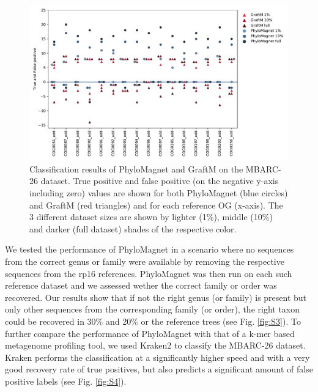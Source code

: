 \documentclass{bioinfo}
\begin{document}
\begin{figure}[!tpb]%
\centerline{\includegraphics[width=.45\textwidth]{Fig2.pdf}}
\caption{Classification results of PhyloMagnet and GraftM on the MBARC-26 dataset. True positive and false positive (on the negative y-axis including zero) values are shown for both PhyloMagnet (blue circles) and GraftM (red triangles) and for each reference OG (x-axis). The 3 different dataset sizes are shown by lighter (1\%), middle (10\%) and darker (full dataset) shades of the respective color.} \label{fig:02}
\end{figure}

We tested the performance of PhyloMagnet in a scenario where no sequences from the correct genus or family were available by removing the respective sequences from the rp16 references. PhyloMagnet was then run on each such reference dataset and we assessed wether the correct family or order was recovered. Our results show that if not the right genus (or family) is present but only other sequences from the corresponding family (or order), the right taxon could be recovered in 30\% and 20\% or the reference trees (see Fig. \ref{fig:S3}).
To further compare the performance of PhyloMagnet with that of a k-mer based metagenome profiling tool, we used Kraken2 \citep{Wood2014,Wood2019} to classify the MBARC-26 dataset. Kraken performs the classification at a significantly higher speed and with a very good recovery rate of true positives, but also predicts a significant amount of false positive labels (see Fig. \ref{fig:S4}). 
\end{document}
